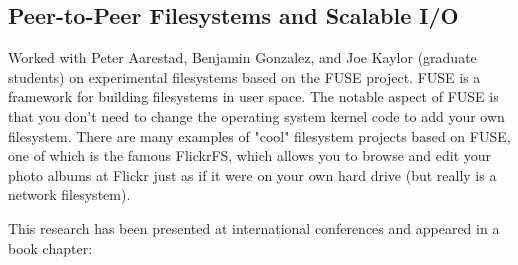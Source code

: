 \subsection{Peer-to-Peer Filesystems and Scalable I/O}

Worked with Peter Aarestad, Benjamin Gonzalez, and Joe Kaylor (graduate students) on experimental filesystems based on the FUSE project. FUSE is a framework for building filesystems in user space. The notable aspect of FUSE is that you don't need to change the operating system kernel code to add your own filesystem. There are many examples of "cool" filesystem projects based on FUSE, one of which is the famous FlickrFS, which allows you to browse and edit your photo albums at Flickr just as if it were on your own hard drive (but really is a network filesystem).

\vspace{5pt}
This research has been presented at international conferences and appeared in a book chapter:

\begin{refsection}
    \nocite{joe_p._kaylor_restfs_2012,joe_p._kaylor_simplifying_2012,joe_p._kaylor_restfs_2011,joe_p._kaylor_online_2010}
    \nocite{aarestad_scalable_2006}
    \nocite{gonzalez_hydra_2006-1}
    \printbibliography[heading=none]
\end{refsection}

